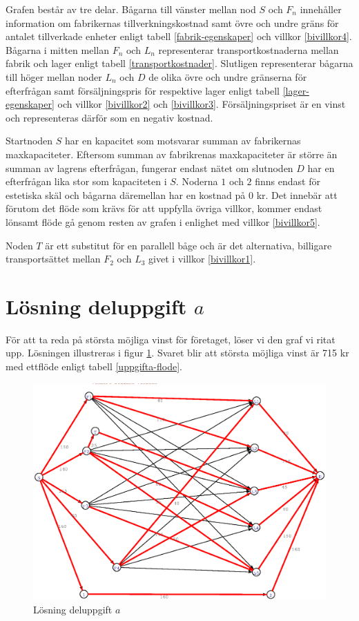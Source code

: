 \documentclass[titlepage, a4paper]{article}
\begin{document}
Grafen består av tre delar. Bågarna till vänster mellan nod $S$ och $F_{n}$ innehåller information om fabrikernas tillverkningskostnad samt övre och undre gräns för antalet tillverkade enheter enligt tabell \ref{fabrik-egenskaper} och villkor \ref{bivillkor4}. Bågarna i mitten mellan $F_{n}$ och $L_{n}$ representerar transportkostnaderna mellan fabrik och lager enligt tabell \ref{transportkostnader}. Slutligen representerar bågarna till höger mellan noder $L_{n}$ och $D$ de olika övre och undre gränserna för efterfrågan samt försäljningspris för respektive lager enligt tabell \ref{lager-egenskaper} och villkor \ref{bivillkor2} och \ref{bivillkor3}. Försäljningspriset är en vinst och representeras därför som en negativ kostnad.

Startnoden $S$ har en kapacitet som motsvarar summan av fabrikernas maxkapaciteter. Eftersom summan av fabrikrenas maxkapaciteter är större än summan av lagrens efterfrågan, fungerar endast nätet om slutnoden $D$ har en efterfrågan lika stor som kapaciteten i $S$. Noderna $1$ och $2$ finns endast för estetiska skäl och bågarna däremellan har en kostnad på 0 kr. Det innebär att förutom det flöde som krävs för att uppfylla övriga villkor, kommer endast lönsamt flöde gå genom resten av grafen i enlighet med villkor \ref{bivillkor5}.

Noden $T$ är ett substitut för en parallell båge och är det alternativa, billigare transportsättet mellan $F_{2}$ och $L_{3}$ givet i villkor \ref{bivillkor1}.

\section{Lösning deluppgift $a$}

För att ta reda på största möjliga vinst för företaget, löser vi den graf vi ritat upp. Lösningen illustreras i figur \ref{uppgifta-losning}. Svaret blir att största möjliga vinst är 715 kr med ettflöde enligt tabell \ref{uppgifta-flode}.

\begin{figure}[h!]
\centerline{\includegraphics[scale=0.65]{laborationsuppgift_13a_solved.ps}}
\caption{Lösning deluppgift $a$} \label{uppgifta-losning}
\end{figure}
\end{document}
